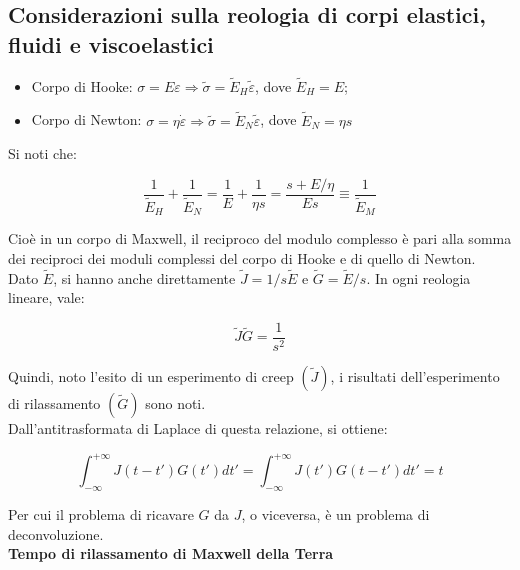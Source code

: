 \documentclass[a4paper,12pt]{book}
\begin{document}
\subsection{\textcolor{colore7}{Considerazioni sulla reologia di corpi elastici, fluidi e viscoelastici}}

\begin{itemize}
    \item Corpo di Hooke: $\sigma = E \varepsilon \Longrightarrow \tilde{\sigma} = \tilde{E}_H \tilde{\varepsilon}$, dove $\tilde{E}_H = E$;
    \item Corpo di Newton: $\sigma = \eta \dot{\varepsilon} \Longrightarrow \tilde{\sigma} = \tilde{E}_N \tilde{\varepsilon}$, dove $\tilde{E}_N = \eta s$
\end{itemize}

\noindent Si noti che:

\begin{equation}
    \frac{1}{\tilde{E}_H} + \frac{1}{\tilde{E}_N} = \frac{1}{E} + \frac{1}{\eta s} = \frac{s + E/\eta}{Es} \equiv \frac{1}{\tilde{E}_M}
\end{equation}

\noindent
Cioè in un corpo di Maxwell, il reciproco del modulo complesso è pari alla somma dei reciproci dei moduli complessi del corpo di Hooke e di quello di Newton.\\

\noindent
Dato $\tilde{E}$, si hanno anche direttamente $\tilde{J} = 1/s \tilde{E}$ e $\tilde{G} = \tilde{E}/s$.
In ogni reologia lineare, vale:

\begin{equation}
    \tilde{J} \tilde{G} = \frac{1}{s^2}
\end{equation}

\noindent
Quindi, noto l'esito di un esperimento di creep $(\tilde J)$, i risultati dell'esperimento di rilassamento $(\tilde G)$ sono noti.\\

\noindent
Dall'antitrasformata di Laplace di questa relazione, si ottiene:

\begin{equation}
    \int_{-\infty}^{+\infty} J(t - t')G(t')dt' = \int_{-\infty}^{+\infty} J(t')G(t-t')dt' = t
\end{equation}

\noindent Per cui il problema di ricavare $G$ da $J$, o viceversa, è un problema di deconvoluzione.\\

\noindent
\textbf{Tempo di rilassamento di Maxwell della Terra}\\
\end{document}
